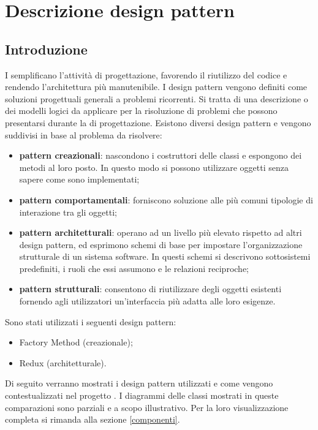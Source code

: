 \newpage
\section{Descrizione design pattern}
\subsection{Introduzione}
I  semplificano l'attività di progettazione, favorendo il riutilizzo del codice e rendendo l'architettura più manutenibile. I design pattern vengono definiti come soluzioni progettuali generali a problemi ricorrenti. Si tratta di una descrizione o dei modelli logici da applicare per la risoluzione di problemi che possono presentarsi durante la  di progettazione. Esistono diversi design pattern e vengono suddivisi in base al problema da risolvere:
\begin{itemize}
	\item \textbf{pattern creazionali}: nascondono i costruttori delle classi e espongono dei metodi al loro posto. In questo modo si possono utilizzare oggetti senza sapere come sono implementati;
	\item \textbf{pattern comportamentali}: forniscono soluzione alle più comuni tipologie di interazione tra gli oggetti;
	\item \textbf{pattern architetturali}: operano ad un livello più elevato rispetto ad altri design pattern, ed esprimono schemi di base per impostare l'organizzazione strutturale di un sistema software. In questi schemi si descrivono sottosistemi predefiniti, i ruoli che essi assumono e le relazioni reciproche;
	\item \textbf{pattern strutturali}: consentono di riutilizzare degli oggetti esistenti fornendo agli utilizzatori un'interfaccia più adatta alle loro esigenze.
\end{itemize}
Sono stati utilizzati i seguenti design pattern:
\begin{itemize}
	\item Factory Method (creazionale);
	\item Redux (architetturale).
\end{itemize}

Di seguito verranno mostrati i design pattern utilizzati e come vengono contestualizzati nel progetto \progetto{}. I diagrammi delle classi mostrati in queste comparazioni sono parziali e a scopo illustrativo. Per la loro visualizzazione completa si rimanda alla sezione \ref{componenti}.

